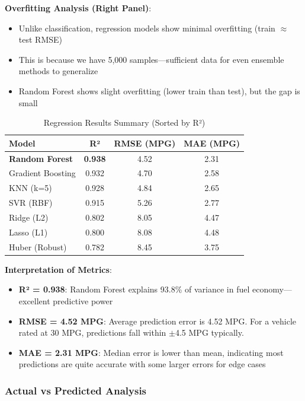 \documentclass[11pt,a4paper]{article}
\begin{document}
\textbf{Overfitting Analysis (Right Panel)}:
\begin{itemize}[leftmargin=*]
    \item Unlike classification, regression models show minimal overfitting (train $\approx$ test RMSE)
    \item This is because we have 5,000 samples---sufficient data for even ensemble methods to generalize
    \item Random Forest shows slight overfitting (lower train than test), but the gap is small
\end{itemize}

\begin{table}[H]
\centering
\caption{Regression Results Summary (Sorted by R²)}
\begin{tabular}{lccc}
\toprule
\textbf{Model} & \textbf{R²} & \textbf{RMSE (MPG)} & \textbf{MAE (MPG)} \\
\midrule
\textbf{Random Forest} & \textbf{0.938} & 4.52 & 2.31 \\
Gradient Boosting & 0.932 & 4.70 & 2.58 \\
KNN (k=5) & 0.928 & 4.84 & 2.65 \\
SVR (RBF) & 0.915 & 5.26 & 2.77 \\
Ridge (L2) & 0.802 & 8.05 & 4.47 \\
Lasso (L1) & 0.800 & 8.08 & 4.48 \\
Huber (Robust) & 0.782 & 8.45 & 3.75 \\
\bottomrule
\end{tabular}
\end{table}

\textbf{Interpretation of Metrics}:
\begin{itemize}[leftmargin=*]
    \item \textbf{R² = 0.938}: Random Forest explains 93.8\% of variance in fuel economy---excellent predictive power
    \item \textbf{RMSE = 4.52 MPG}: Average prediction error is 4.52 MPG. For a vehicle rated at 30 MPG, predictions fall within $\pm$4.5 MPG typically.
    \item \textbf{MAE = 2.31 MPG}: Median error is lower than mean, indicating most predictions are quite accurate with some larger errors for edge cases
\end{itemize}

\subsubsection{Actual vs Predicted Analysis}
\end{document}
